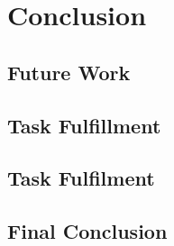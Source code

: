 \chapter{Conclusion}
\label{chp:conclusion} 

\section{Future Work}

\section{Task Fulfillment}

\section{Task Fulfilment}

\section{Final Conclusion}